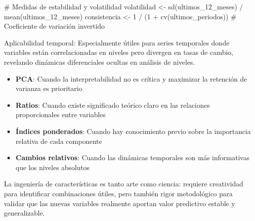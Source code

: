 \documentclass[
  letterpaper,
  DIV=11,
  numbers=noendperiod]{scrreprt}
\newenvironment{Shaded}{\begin{snugshade}}{\end{snugshade}}
\newcommand{\CommentTok}[1]{\textcolor[rgb]{0.37,0.37,0.37}{#1}}
\newcommand{\DecValTok}[1]{\textcolor[rgb]{0.68,0.00,0.00}{#1}}
\newcommand{\FunctionTok}[1]{\textcolor[rgb]{0.28,0.35,0.67}{#1}}
\newcommand{\NormalTok}[1]{\textcolor[rgb]{0.00,0.23,0.31}{#1}}
\newcommand{\OtherTok}[1]{\textcolor[rgb]{0.00,0.23,0.31}{#1}}
\newcommand{\SpecialCharTok}[1]{\textcolor[rgb]{0.37,0.37,0.37}{#1}}
\providecommand{\tightlist}{%
  \setlength{\itemsep}{0pt}\setlength{\parskip}{0pt}}
\begin{document}
\begin{enumerate}
\begin{Shaded}
\begin{Highlighting}[]
\CommentTok{\# Medidas de estabilidad y volatilidad}
\NormalTok{volatilidad }\OtherTok{\textless{}{-}} \FunctionTok{sd}\NormalTok{(ultimos\_12\_meses) }\SpecialCharTok{/} \FunctionTok{mean}\NormalTok{(ultimos\_12\_meses)}
\NormalTok{consistencia }\OtherTok{\textless{}{-}} \DecValTok{1} \SpecialCharTok{/}\NormalTok{ (}\DecValTok{1} \SpecialCharTok{+} \FunctionTok{cv}\NormalTok{(ultimos\_periodos))  }\CommentTok{\# Coeficiente de variación invertido}
\end{Highlighting}
\end{Shaded}

  Aplicabilidad temporal: Especialmente útiles para series temporales
  donde variables están correlacionadas en niveles pero divergen en
  tasas de cambio, revelando dinámicas diferenciales ocultas en análisis
  de niveles.
\end{enumerate}

\begin{tcolorbox}[enhanced jigsaw, leftrule=.75mm, breakable, colbacktitle=quarto-callout-note-color!10!white, bottomrule=.15mm, colframe=quarto-callout-note-color-frame, toprule=.15mm, colback=white, coltitle=black, bottomtitle=1mm, left=2mm, title=\textcolor{quarto-callout-note-color}{\faInfo}\hspace{0.5em}{Criterios de selección de estrategia}, opacityback=0, arc=.35mm, opacitybacktitle=0.6, toptitle=1mm, titlerule=0mm, rightrule=.15mm]

\begin{itemize}
\tightlist
\item
  \textbf{PCA}: Cuando la interpretabilidad no es crítica y maximizar la
  retención de varianza es prioritario
\item
  \textbf{Ratios}: Cuando existe significado teórico claro en las
  relaciones proporcionales entre variables
\item
  \textbf{Índices ponderados}: Cuando hay conocimiento previo sobre la
  importancia relativa de cada componente
\item
  \textbf{Cambios relativos}: Cuando las dinámicas temporales son más
  informativas que los niveles absolutos
\end{itemize}

\end{tcolorbox}

La ingeniería de características es tanto arte como ciencia: requiere
creatividad para identificar combinaciones útiles, pero también rigor
metodológico para validar que las nuevas variables realmente aportan
valor predictivo estable y generalizable.
\end{document}
